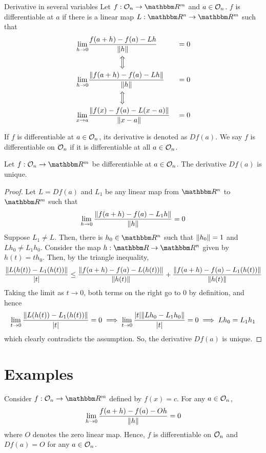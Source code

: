 \documentclass[../Analysis-3]{subfiles}
\begin{document}
\begin{Def}{Derivative in several variables}{}
  Let $ f : {\cal O}_n \to \R^m $ and $ a \in {\cal O}_n $. $ f $ is differentiable at $ a $ if there is a linear map $ L : \R^n \to \R^m $ such that
  \begin{alignat*}{2}
    \lim_{h \to 0} & \frac{f(a+h)-f(a)-Lh}{\norm{h}}            &  & = 0 \\
                   & \qquad \qquad \,\,\Big \Updownarrow                 \\
    \lim_{h \to 0} & \frac{\norm{f(a+h)-f(a)-Lh}}{\norm{h}}     &  & = 0 \\
                   & \qquad \qquad \,\, \Big \Updownarrow                \\
    \lim_{x \to a} & \frac{\norm{f(x)-f(a)-L(x-a)}}{\norm{x-a}} &  & = 0 \\
  \end{alignat*}

  If $ f $ is differentiable at $ a \in {\cal O}_n $, its derivative is denoted as $ Df(a) $. We say $ f $ is differentiable on $ {\cal O}_n $ if it is differentiable at all $ a \in {\cal O}_n $.
\end{Def}

\begin{Thm}{}{}
  Let $ f: {\cal O}_n \to \R^m $ be differentiable at $ a \in {\cal O}_n $. The derivative $ Df(a) $ is unique.
\end{Thm}
\begin{proof}
  Let $ L = Df(a) $ and $ L_1 $ be any linear map from $ \R^n $ to $ \R^m $ such that
  \[ \lim_{h \to 0} \frac{\norm{f(a+h)-f(a)-L_1h}}{\norm{h}} = 0 \]
  Suppose $ L_1 \neq L $. Then, there is $ h_0 \in \R^n $ such that $ \norm{h_0} = 1 $ and $ Lh_0 \neq L_1h_0 $. Consider the map $ h: \R \to \R^n $ given by $ h(t) = th_0 $. Then, by the triangle inequality,
  \[ \frac{\norm{L(h(t))-L_1(h(t))}}{\abs{t}} \leq \frac{\norm{f(a+h)-f(a)-L(h(t))}}{\norm{h(t)}} + \frac{\norm{f(a+h)-f(a)-L_1(h(t))}}{\norm{h(t)}} \]
  Taking the limit as $ t \to 0 $, both terms on the right go to 0 by definition, and hence
  \[ \lim_{t \to 0} \frac{\norm{L(h(t))-L_1(h(t))}}{\abs{t}} = 0 \implies \lim_{t \to 0} \frac{\abs{t}\norm{Lh_0-L_1h_0}}{\abs{t}} = 0 \implies Lh_0 = L_1h_1\]
  which clearly contradicts the assumption. So, the derivative $ Df(a) $ is unique.
\end{proof}

\section{Examples}
\begin{Eg}{}{}
  Consider $ f: {\cal O}_n \to\R^m $ defined by $ f(x) = c $. For any $ a \in {\cal O}_n $,
  \[ \lim_{h \to 0} \frac{f(a+h)-f(a)-Oh}{\norm{h}} = 0 \]
  where $ O $ denotes the zero linear map. Hence, $ f $ is differentiable on $ {\cal O}_n $ and $ Df(a) = O $ for any $ a \in {\cal O}_n $.
\end{Eg}
\end{document}
